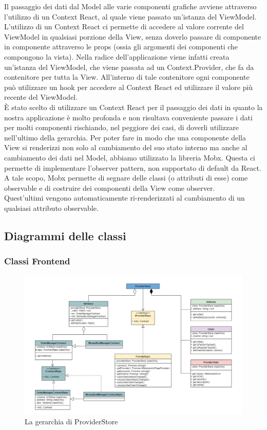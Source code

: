Il passaggio dei dati dal Model alle varie componenti grafiche avviene attraverso l'utilizzo di un Context
React, al quale viene passato un'istanza del ViewModel. L'utilizzo di un Context React ci permette di
accedere al valore corrente del ViewModel in qualsiasi porzione della View, senza doverlo passare di
componente in componente attraverso le props (ossia gli argomenti dei componenti che compongono la
vista). Nella radice dell'applicazione viene infatti creata un'istanza del ViewModel, che viene passata
ad un Context.Provider, che fa da contenitore per tutta la View. All'interno di tale contenitore ogni
componente può utilizzare un hook per accedere al Context React ed utilizzare il valore più recente del ViewModel.
\\
È stato scelto di utilizzare un Context React per il passaggio dei dati in quanto la nostra applicazione è
molto profonda e non risultava conveniente passare i dati per molti componenti rischiando, nel peggiore
dei casi, di doverli utilizzare nell'ultimo della gerarchia.
Per poter fare in modo che una componente della View si renderizzi non solo al cambiamento del
suo stato interno ma anche al cambiamento dei dati nel Model, abbiamo utilizzato la libreria Mobx\glo{}.
Questa ci permette di implementare l'observer pattern\glo{}, non supportato di default da React. A tale
scopo, Mobx\glo{} permette di segnare delle classi (o attributi di esse) come observable\glo{} e di costruire
dei componenti della View come observer\glo{}. \\Quest'ultimi vengono automaticamente ri-renderizzati al
cambiamento di un qualsiasi attributo observable.

\subsection{Diagrammi delle classi}

\subsubsection{Classi Frontend}

\begin{figure}[H]
    \centering
    \includegraphics[scale = 0.5]{immagini/providerstore.png}
    \caption{La gerarchia di ProviderStore}
\end{figure}

